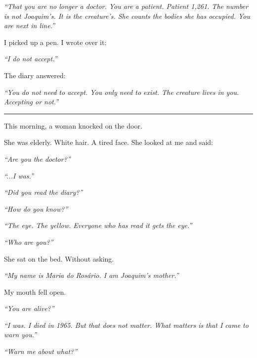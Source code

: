 \noindent \textit{\textquotedblleft{}That you are no longer a doctor. You are a patient. Patient 1,261. The number is not Joaquim's. It is the creature's. She counts the bodies she has occupied. You are next in line.\textquotedblright{}}

\noindent I picked up a pen. I wrote over it:

\noindent \textit{\textquotedblleft{}I do not accept.\textquotedblright{}}

\noindent The diary answered:

\noindent \textit{\textquotedblleft{}You do not need to accept. You only need to exist. The creature lives in you. Accepting or not.\textquotedblright{}}

\vspace{0.5em}\noindent\rule{\textwidth}{0.5pt}\vspace{0.5em}

\noindent This morning, a woman knocked on the door.

\noindent She was elderly. White hair. A tired face. She looked at me and said:

\noindent \textit{\textquotedblleft{}Are you the doctor?\textquotedblright{}}

\noindent \textit{\textquotedblleft{}...I was.\textquotedblright{}}

\noindent \textit{\textquotedblleft{}Did you read the diary?\textquotedblright{}}

\noindent \textit{\textquotedblleft{}How do you know?\textquotedblright{}}

\noindent \textit{\textquotedblleft{}The eye. The yellow. Everyone who has read it gets the eye.\textquotedblright{}}

\noindent \textit{\textquotedblleft{}Who are you?\textquotedblright{}}

\noindent She sat on the bed. Without asking.

\noindent \textit{\textquotedblleft{}My name is Maria do Rosário. I am Joaquim's mother.\textquotedblright{}}

\noindent My mouth fell open.

\noindent \textit{\textquotedblleft{}You are alive?\textquotedblright{}}

\noindent \textit{\textquotedblleft{}I was. I died in 1965. But that does not matter. What matters is that I came to warn you.\textquotedblright{}}

\noindent \textit{\textquotedblleft{}Warn me about what?\textquotedblright{}}

